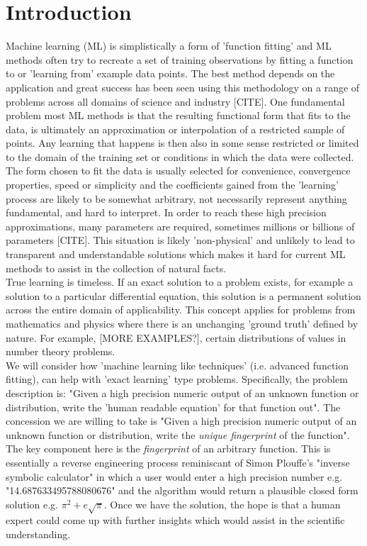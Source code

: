 \documentclass{article}
\begin{document}
\section{Introduction}
Machine learning (ML) is simplistically a form of 'function fitting' and ML methods often try to recreate a set of training observations by fitting a function to or 'learning from' example data points. The best method depends on the application and great success has been seen using this methodology on a range of problems across all domains of science and industry {\color{red}[CITE]}. One fundamental problem most ML methods is that the resulting functional form that fits to the data, is ultimately an approximation or interpolation of a restricted sample of points. Any learning that happens is then also in some sense restricted or limited to the domain of the training set or conditions in which the data were collected. The form chosen to fit the data is usually selected for convenience, convergence properties, speed or simplicity and the coefficients gained from the 'learning' process are likely to be somewhat arbitrary, not necessarily represent anything fundamental, and hard to interpret. In order to reach these high precision approximations, many parameters are required, sometimes millions or billions of parameters {\color{red}[CITE]}. This situation is likely 'non-physical' and unlikely to lead to transparent and understandable solutions which makes it hard for current ML methods to assist in the collection of natural facts. \\

True learning is timeless. If an exact solution to a problem exists, for example a solution to a particular differential equation, this solution is a permanent solution across the entire domain of applicability. This concept applies for problems from mathematics and physics where there is an unchanging 'ground truth' defined by nature. For example, {\color{red}[MORE EXAMPLES?], certain distributions of values in number theory problems}. \\


We will consider how 'machine learning like techniques' (i.e. advanced function fitting), can help with 'exact learning' type problems.
Specifically, the problem description is: "Given a high precision numeric output of an unknown function or distribution, write the 'human readable equation' for that function out". The concession we are willing to take is "Given a high precision numeric output of an unknown function or distribution, write the \emph{unique fingerprint} of the function". The key component here is the \emph{fingerprint} of an arbitrary function. This is essentially a reverse engineering process reminiscant of Simon Plouffe's "inverse symbolic calculator" in which a user would enter a high precision number e.g. "14.687633495788080676" and the algorithm would return a plausible closed form solution e.g. $\pi^2 + e\sqrt{\pi}$. Once we have the solution, the hope is that a human expert could come up with further insights which would assist in the scientific understanding.
\end{document}

